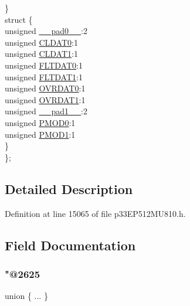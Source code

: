\begin{DoxyCompactItemize}
\begin{tabbing}
\>\} \\
\>struct \{\\
\>\>unsigned \hyperlink{structtag_i_o_c_o_n5_b_i_t_s_adf71f3d8410c1f1dbbc96680a92c49af}{\_\_pad0\_\_}:2\\
\>\>unsigned \hyperlink{structtag_i_o_c_o_n5_b_i_t_s_a524fe5d7c4f19a9e5bab6fdae8cb6113}{CLDAT0}:1\\
\>\>unsigned \hyperlink{structtag_i_o_c_o_n5_b_i_t_s_abd730465de1cbb6fd169fef4c9f97b9e}{CLDAT1}:1\\
\>\>unsigned \hyperlink{structtag_i_o_c_o_n5_b_i_t_s_a154c32b551ecc420f476def330e87abd}{FLTDAT0}:1\\
\>\>unsigned \hyperlink{structtag_i_o_c_o_n5_b_i_t_s_a76d169f1247080fb508c7b31f62e89ab}{FLTDAT1}:1\\
\>\>unsigned \hyperlink{structtag_i_o_c_o_n5_b_i_t_s_a45d53d0768dd2659f98447ad77cc91b1}{OVRDAT0}:1\\
\>\>unsigned \hyperlink{structtag_i_o_c_o_n5_b_i_t_s_a095c02d71ec41de4ed9985a86207253f}{OVRDAT1}:1\\
\>\>unsigned \hyperlink{structtag_i_o_c_o_n5_b_i_t_s_acaf2d0924a107ec6e8d2e31febaf66f9}{\_\_pad1\_\_}:2\\
\>\>unsigned \hyperlink{structtag_i_o_c_o_n5_b_i_t_s_ac125b1e88bd44f7f044dcb0185cfb781}{PMOD0}:1\\
\>\>unsigned \hyperlink{structtag_i_o_c_o_n5_b_i_t_s_a961c1af920bb390a3b4ff925e45fa059}{PMOD1}:1\\
\>\} \\
\}; \\

\end{tabbing}\end{DoxyCompactItemize}


\subsection{Detailed Description}


Definition at line 15065 of file p33\+E\+P512\+M\+U810.\+h.



\subsection{Field Documentation}
\mbox{\label{structtag_i_o_c_o_n5_b_i_t_s_a8f1e08e111323b6df283d7e5646f2860}} 
\subsubsection{\texorpdfstring{"@2625}{@2625}}
{\footnotesize\ttfamily union \{ ... \} }

